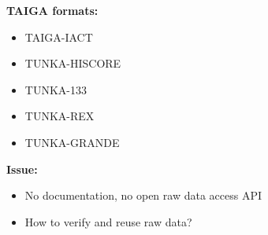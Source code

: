 \documentclass[a0paper,portrait]{baposter}
\begin{document}
\begin{poster}
{ \textbf{TAIGA formats:}
	 \begin{itemize}
	  	\item TAIGA-IACT
	  	\item TUNKA-HISCORE
  		\item TUNKA-133
  		\item TUNKA-REX  
		  \item TUNKA-GRANDE
	  \end{itemize}
    \textbf{Issue:}
	  \begin{itemize}
  		\item No documentation, no open raw data access API
  		\item How to verify and reuse raw data?  
  	\end{itemize}
		\vspace{0.17cm}
}

\end{poster}
\end{document}
